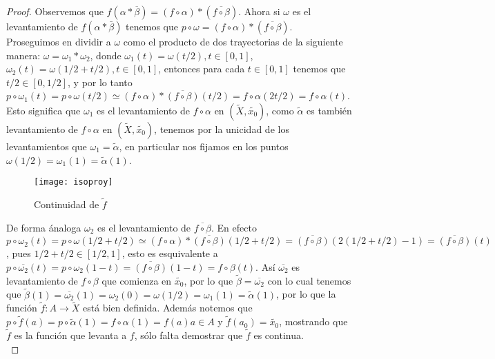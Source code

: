 \begin{proof}
Observemos que $f(\alpha * \overline{\beta}) = (f \circ \alpha)* (\overline{f \circ \beta})$. Ahora si $\omega$ es el levantamiento de $f(\alpha * \bar{\beta})$ tenemos que $p \circ \omega = (f \circ \alpha)* (\overline{f \circ \beta})$.\\

Proseguimos en dividir a $\omega$ como el producto de dos trayectorias de la siguiente manera: $\omega = \omega_1 * \omega_2$, donde $\omega_1(t)=\omega (t/2), t \in [0,1]$, $\omega_2 (t)= \omega (1/2 + t/2), t \in [0,1]$, entonces para cada $t \in [0,1]$ tenemos que $t/2 \in [0,1/2]$, y por lo tanto $p \circ \omega_1 (t)=p \circ \omega(t/2) \simeq (f \circ \alpha)* \overline{(f \circ \beta)}(t/2) = f \circ \alpha(2t/2)= f \circ \alpha (t)$. Esto significa que $\omega_1$ es el levantamiento de $f \circ \alpha$ en $(\widetilde{X},\widetilde{x_0})$, como $\widetilde{\alpha}$ es tambi\'en levantamiento de $f \circ \alpha$ en $(\widetilde{X},\widetilde{x_0})$, tenemos por la unicidad de los levantamientos que $\omega_1 = \widetilde{\alpha}$, en particular nos fijamos en los puntos $\omega(1/2)= \omega_1(1)=\widetilde{\alpha}(1)$.\\


\begin{figure}[h]
\begin{center}
      \texttt{[image: isoproy]}
\end{center}
\caption{Continuidad de $\widetilde{f}$}
\end{figure} 




De forma \'analoga $\omega_2$ es el levantamiento de $\overline{f \circ \beta}$. En efecto $p \circ \omega_2 (t)= p \circ \omega(1/2 + t/2) \simeq (f \circ \alpha)* \overline{(f \circ \beta)}(1/2 + t/2) =  \overline{(f \circ \beta)}(2(1/2 + t/2) -1)= \overline{(f \circ \beta)}(t)$, pues $1/2+t/2 \in [1/2,1]$, esto es esquivalente a $p \circ \overline{\omega_2}(t)=p \circ \omega_2(1-t)= \overline{(f \circ \beta)}(1-t)= f \circ \beta (t)$. As\'i $\overline{\omega_2}$ es levantamiento de $f \circ \beta$ que comienza en $\widetilde{x_0}$, por lo que $\widetilde{\beta}= \overline{\omega_2}$ con lo cual tenemos que 
$\widetilde{\beta}(1)=\overline{\omega_2}(1)=\omega_2(0)=\omega(1/2)=\omega_1(1)=\widetilde{\alpha}(1)$, por lo que la funci\'on $\widetilde{f}:A \rightarrow \widetilde{X}$ est\'a bien definida. Adem\'as notemos que $p \circ \widetilde{f}(a)= p \circ \widetilde{\alpha}(1)=f \circ \alpha (1)= f(a) a \in A$ y $\widetilde{f}(a_0) = \widetilde{x_0}$, mostrando que $\widetilde{f}$ es la funci\'on que levanta a $f$, s\'olo falta demostrar que $\widetilde{f}$ es continua.\\


\end{proof}

